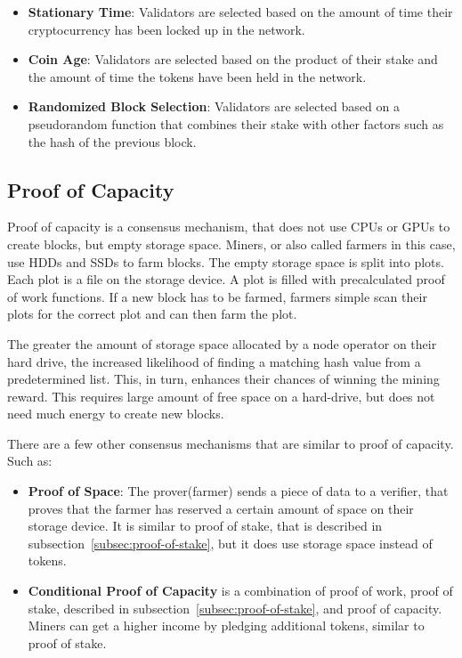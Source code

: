 \begin{itemize}
    \item\textbf{Stationary Time}: Validators are selected based on the amount of time their cryptocurrency has been locked up in the network.\cite{bitpanda-pos}
    \item\textbf{Coin Age}: Validators are selected based on the product of their stake and the amount of time the tokens have been held in the network.\cite{bitflyer-glossary}
    \item\textbf{Randomized Block Selection}: Validators are selected based on a pseudorandom function that combines their stake with other factors such as the hash of the previous block.\cite{cryptonews-pos}
\end{itemize}

\subsection{Proof of Capacity}\label{subsec:proof-of-capacity}
Proof of capacity is a consensus mechanism, that does not use CPUs or GPUs to create blocks, but empty storage space.
Miners, or also called farmers in this case, use HDDs and SSDs to farm blocks.
The empty storage space is split into plots.
Each plot is a file on the storage device.
A plot is filled with precalculated proof of work functions.
If a new block has to be farmed, farmers simple scan their plots for the correct plot and can then farm the plot.

The greater the amount of storage space allocated by a node operator on their hard drive, the increased likelihood of finding a matching hash value from a predetermined list.
This, in turn, enhances their chances of winning the mining reward.
This requires large amount of free space on a hard-drive, but does not need much energy to create new blocks.\cite{chia-whitepaper,geeksforgeeks-poc}

There are a few other consensus mechanisms that are similar to proof of capacity.
Such as:
\begin{itemize}
    \item\textbf{Proof of Space}: The prover(farmer) sends a piece of data to a verifier, that proves that the farmer has reserved a certain amount of space on their storage device.
    It is similar to proof of stake, that is described in subsection\ \ref{subsec:proof-of-stake}, but it does use storage space instead of tokens.
    \item\textbf{Conditional Proof of Capacity} is a combination of proof of work, proof of stake, described in subsection\ \ref{subsec:proof-of-stake}, and proof of capacity.
    Miners can get a higher income by pledging additional tokens, similar to proof of stake.
\end{itemize}

